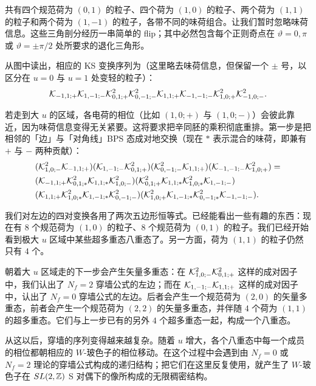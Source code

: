 共有四个规范荷为 $(0,1)$ 的粒子、四个荷为 $(1,0)$ 的粒子、两个荷为 $(1,1)$ 的粒子和两个荷为 $(1,-1)$ 的粒子，各带不同的味荷组合。让我们暂时忽略味荷信息。这些三角剖分经历一串简单的 flip；其中必然包含每个正则奇点在 $\vartheta=0,\pi$ 或 $\vartheta=\pm\pi/2$ 处所要求的退化三角形。

从图中读出，相应的 KS 变换序列为（这里略去味荷信息，但保留一个 $\pm$ 号，以区分在 $u=0$ 与 $u=1$ 处变轻的粒子）：
\begin{equation}\label{eq:12ParticlesK}
\mathcal{K}_{-1,1;+}\mathcal{K}_{1,-1;-}\mathcal{K}_{0,1;+}^2 \mathcal{K}_{0,-1;-}^2 \mathcal{K}_{1,1;+}\mathcal{K}_{-1,-1;-}\mathcal{K}_{1,0;+}^2 \mathcal{K}_{-1,0;-}^2.
\end{equation}

若走到大 $u$ 的区域，各电荷的相位（比如 $(1,0;+)$ 与 $(1,0;-)$）会彼此靠近，因为味荷信息变得无关紧要。这将要求把辛同胚的乘积彻底重排。第一步是把相邻的「边」与「对角线」BPS 态成对地交换（现在 $*$ 表示混合的味荷，即兼有 $+$ 与 $-$ 两种贡献）：
\begin{equation}
\begin{split}
&(\mathcal{K}_{1,0;-}^2 \mathcal{K}_{-1,1;+})(\mathcal{K}_{1,-1;-}\mathcal{K}_{0,1;+}^2)( \mathcal{K}_{0,-1;-}^2\mathcal{K}_{1,1;+})(\mathcal{K}_{-1,-1;-}\mathcal{K}_{1,0;+}^2) = \\
&(\mathcal{K}_{-1,1;+}\mathcal{K}_{0,1;*}^2\mathcal{K}_{1,1;*}\mathcal{K}_{1,0;-}^2 )(\mathcal{K}_{0,1;+}^2\mathcal{K}_{1,1;*}\mathcal{K}_{1,0;*}^2\mathcal{K}_{1,-1;-}) \\
&(\mathcal{K}_{1,1;+}\mathcal{K}_{1,0;*}^2\mathcal{K}_{1,-1;*} \mathcal{K}_{0,-1;-}^2)(\mathcal{K}_{1,0;+}^2\mathcal{K}_{1,-1;*}\mathcal{K}_{0,-1;*}^2\mathcal{K}_{-1,-1;-}).
\end{split}
\end{equation}

我们对左边的四对变换各用了两次五边形恒等式。已经能看出一些有趣的东西：现在有 $8$ 个规范荷为 $(1,0)$ 的粒子、$8$ 个规范荷为 $(0,1)$ 的粒子。我们已经开始看到极大 $u$ 区域中某些超多重态八重态了。另一方面，荷为 $(1,1)$ 的粒子仍然只有 $4$ 个。

朝着大 $u$ 区域走的下一步会产生矢量多重态：在 $\mathcal{K}_{1,0;-}^2 \mathcal{K}_{0,1;+}^2$ 这样的成对因子中，我们认出了 $N_f=2$ 穿墙公式的左边；而在 $\mathcal{K}_{1,-1;-}\mathcal{K}_{1,1;+}$ 这样的成对因子中，认出了 $N_f=0$ 穿墙公式的左边。后者会产生一个规范荷为 $(2,0)$ 的矢量多重态，前者会产生一个规范荷为 $(2,2)$ 的矢量多重态，并伴随 $4$ 个荷为 $(1,1)$ 的超多重态。它们与上一步已有的另外 $4$ 个超多重态一起，构成一个八重态。

从这以后，穿墙的序列变得越来越复杂。随着 $u$ 增大，各个八重态中每一个成员的相位都朝相应的 $W$-玻色子的相位移动。在这个过程中会遇到由 $N_f=0$ 或 $N_f=2$ 理论的穿墙公式构成的递归结构；把它们在这里反复使用，就产生了 $W$-玻色子在 $SL(2,\mathbb{Z})$ S 对偶下的像所构成的无限稠密结构。

